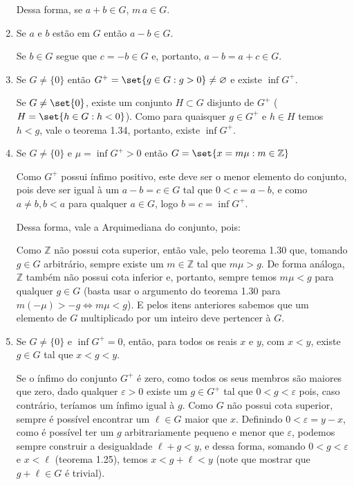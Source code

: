 \documentclass{IMTexam}
\let\emptyset\varnothing
\begin{document}
\begin{questions}
\begin{enumerate}[label=(\roman*)]
\begin{solution}
				Dessa forma, se $ a+b\in G $, $ m\,a\in G $.
			\end{solution}
			\item Se $ a $ e $ b $ estão em $ G $ então $ a − b \in G $.
			
			\begin{solution}
				Se $ b\in G $ segue que $ c=-b\in G $ e, portanto, $ a-b=a+c\in G $.
				
				\hfill\qedsymbol
			\end{solution}
			\item Se $ G \neq \{0\} $ então $ G^{+} = \set{g \in G : g > 0} \neq \emptyset $ e existe $ \inf G^{+} $.
			
			\begin{solution}
				Se $ G\neq\set{0} $, existe um conjunto $ H\subset G $ disjunto de $ G^{+} $ ($ H=\set{h\in G : h<0} $). Como para quaisquer $ g\in G^{+} $ e $ h\in H $ temos $ h < g $, vale o teorema 1.34, portanto, existe $ \inf G^{+} $.
			\end{solution}
			\item Se $ G \neq \{0\} $ e $ \mu = \inf G^{+} > 0 $ então $ G = \set{x = m\mu : m \in \mathbb{Z}} $
			
			\begin{solution}
				Como $ G^{+} $ possui ínfimo positivo, este deve ser o menor elemento do conjunto, pois deve ser igual à um $ a-b=c\in G $ tal que $ 0<c=a-b $, e como $ a\neq b, b<a $ para qualquer $ a\in G $, logo $ b=c=\inf G^{+} $.
				
				Dessa forma, vale a Arquimediana do conjunto, pois:
				
				Como $ \mathbb{Z} $ não possui cota superior, então vale, pelo teorema 1.30 que, tomando $ g\in G $ arbitrário, sempre existe um $ m\in \mathbb{Z} $ tal que $ m\mu>g $. De forma análoga, $ \mathbb{Z} $ também não possui cota inferior e, portanto, sempre temos $ m\mu<g $ para qualquer $ g\in G $ (basta usar o argumento do teorema 1.30 para $ m(-\mu)>-g\iff m\mu<g $). E pelos itens anteriores sabemos que um elemento de $ G $ multiplicado por um inteiro deve pertencer à $ G $.
			\end{solution}
			\item Se $ G \neq \{0\} $ e $ \inf G^{+} = 0 $, então, para todos os reais $ x $ e $ y $, com $ x < y $, existe $ g \in G $ tal que $ x < g < y $.
			
			\begin{solution}
				Se o ínfimo do conjunto $ G^{+} $ é zero, como todos os seus membros são maiores que zero, dado qualquer $ \varepsilon>0 $ existe um $ g\in G^{+} $ tal que $ 0<g<\varepsilon $ pois, caso contrário, teríamos um ínfimo igual à $ g $. Como $ G $ não possui cota superior, sempre é possível encontrar um $ \ell\in G $ maior que $ x $. Definindo $ 0<\varepsilon=y-x $, como é possível ter um $ g $ arbitrariamente pequeno e menor que $ \varepsilon $, podemos sempre construir a desigualdade $ \ell+g<y $, e dessa forma, somando $ 0<g<\varepsilon $ e $ x<\ell $ (teorema 1.25), temos $ x<g+\ell<y $ (note que mostrar que $ g+\ell\in G $ é trivial).
				

\end{solution}
\end{enumerate}
\end{questions}
\end{document}
